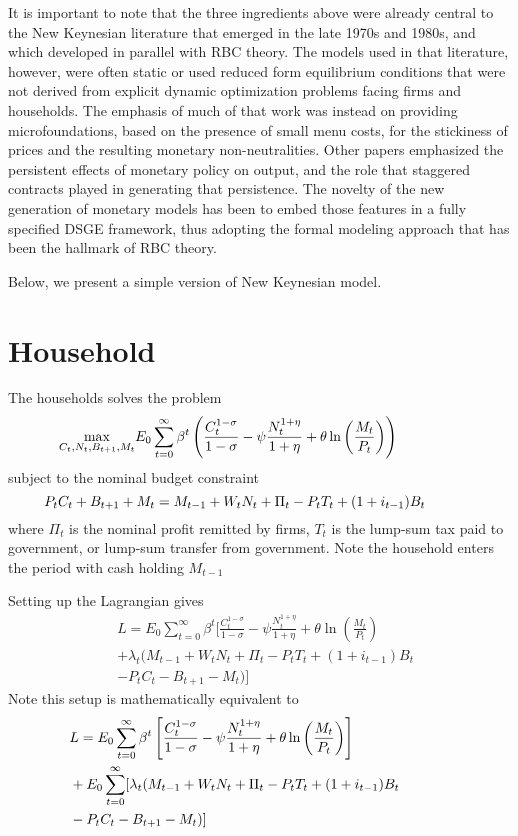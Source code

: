 \documentclass[twocolumn, fleqn]{article}
\begin{document}
	It is important to note that the three ingredients above were already central to the New Keynesian literature that emerged in the late 1970s and 1980s, and which developed in parallel with RBC theory. The models used in that literature, however, were often static or used reduced form equilibrium conditions that were not derived from explicit dynamic optimization problems facing firms and households. The emphasis of much of that work was instead on providing microfoundations, based on the presence of small menu costs, for the stickiness of prices and the resulting monetary non-neutralities. Other papers emphasized the persistent effects of monetary policy on output, and the role that staggered contracts played in generating that persistence. The novelty of the new generation of monetary models has been to embed those features in a fully specified DSGE framework, thus adopting the formal modeling approach that has been the hallmark of RBC theory.
	
	Below, we present a simple version of New Keynesian model. 
	\section{Household}
	The households solves the problem 
	\begin{align*}
	\hspace{-36pt}\max_{C_t, N_t, B_{t+1}, M_t} & E_0 \sum_{t=0}^{\infty} \beta^t \left( \frac{C_t^{1-\sigma}}{1-\sigma} - \psi \frac{N_t^{1+\eta}}{1+\eta} + \theta \ln \left( \frac{M_t}{P_t} \right) \right)	
	\end{align*}
	subject to the nominal budget constraint 
	\[\hspace{-36pt} P_t C_t + B_{t+1} + M_t = M_{t-1} + W_t N_t + \Pi_t - P_t T_t + (1 + i_{t-1}) B_t\]
	where  $\Pi_t$ is the nominal profit remitted by firms, $T_t$ is the lump-sum tax paid to government, or lump-sum transfer from government. Note the household enters the period with cash holding $M_{t-1}$
	
	Setting up the Lagrangian gives
	\begin{align*}
		&L = E_0 \sum_{t=0}^{\infty} \beta^t [ \frac{C_t^{1-\sigma}}{1-\sigma} - \psi \frac{N_t^{1+\eta}}{1+\eta} + \theta \ln \left( \frac{M_t}{P_t} \right)\\
		 &+ \lambda_t ( M_{t-1} + W_t N_t + \Pi_t - P_t T_t + (1 + i_{t-1}) B_t\\
		 &- P_t C_t - B_{t+1} - M_t ) ]
	\end{align*}
	Note this setup is mathematically equivalent to 
	\begin{align*}
		\hspace{-36pt}&L = E_0 \sum_{t=0}^{\infty} \beta^t \left[ \frac{C_t^{1-\sigma}}{1-\sigma} - \psi \frac{N_t^{1+\eta}}{1+\eta} + \theta \ln \left( \frac{M_t}{P_t} \right)\right]\\
		 \hspace{-36pt}&+ E_0 \sum_{t=0}^{\infty} [\lambda_t ( M_{t-1} + W_t N_t + \Pi_t - P_t T_t + (1 + i_{t-1}) B_t\\
		 \hspace{-36pt}&- P_t C_t - B_{t+1} - M_t ) ]
	\end{align*}
\end{document}
